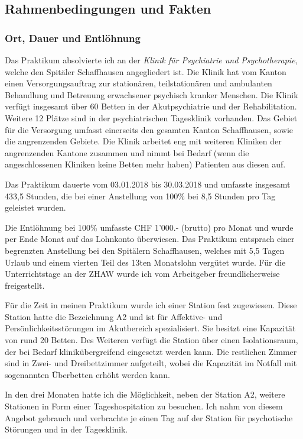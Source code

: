 \subsection{Rahmenbedingungen und Fakten} \label{sec:Rahmenbedingungen}

\subsubsection{Ort, Dauer und Entlöhnung} 
Das Praktikum absolvierte ich an der \textit{Klinik für Psychiatrie und Psychotherapie}, welche den Spitäler Schaffhausen angegliedert ist. Die Klinik hat vom Kanton einen Versorgungsauftrag zur stationären, teilstationären und ambulanten Behandlung und Betreuung erwachsener psychisch kranker Menschen. Die Klinik verfügt insgesamt über 60 Betten in der Akutpsychiatrie und der Rehabilitation. Weitere 12 Plätze sind in der psychiatrischen Tagesklinik vorhanden. Das Gebiet für die Versorgung umfasst einerseits den gesamten Kanton Schaffhausen, sowie die angrenzenden Gebiete. Die Klinik arbeitet eng mit weiteren Kliniken der angrenzenden Kantone zusammen und nimmt bei Bedarf (wenn die angeschlossenen Kliniken keine Betten mehr haben) Patienten aus diesen auf.

Das Praktikum dauerte vom 03.01.2018 bis 30.03.2018 und umfasste insgesamt 433,5 Stunden, die bei einer Anstellung von 100\% bei 8,5 Stunden pro Tag geleistet wurden. 

Die Entlöhnung bei 100\% umfasste CHF 1'000.- (brutto) pro Monat und wurde per Ende Monat auf das Lohnkonto überwiesen. Das Praktikum entsprach einer begrenzten Anstellung bei den Spitälern Schaffhausen, welches mit 5,5 Tagen Urlaub und einem vierten Teil des 13ten Monatslohn vergütet wurde. Für die Unterrichtstage an der ZHAW wurde ich vom Arbeitgeber freundlicherweise freigestellt. 

Für die Zeit in meinen Praktikum wurde ich einer Station fest zugewiesen. Diese Station hatte die Bezeichnung A2 und ist für Affektive-  und Persönlichkeitsstörungen im Akutbereich spezialisiert. Sie besitzt eine Kapazität von rund 20 Betten. Des Weiteren verfügt die Station über einen Isolationsraum, der bei Bedarf klinikübergreifend eingesetzt werden kann. Die restlichen Zimmer sind in Zwei- und Dreibettzimmer aufgeteilt, wobei die Kapazität im Notfall mit sogenannten Überbetten erhöht werden kann. 

In den drei Monaten hatte ich die Möglichkeit, neben der Station A2, weitere Stationen in Form einer Tageshospitation zu besuchen. Ich nahm von diesem Angebot gebrauch und verbrachte je einen Tag auf der Station für psychotische Störungen und in der Tagesklinik. 

